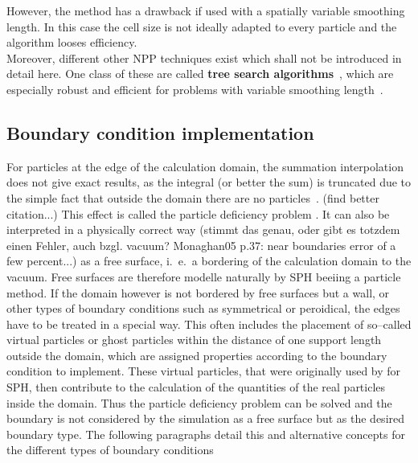 \documentclass{report}
\begin{document}
However, the method has a drawback if used with a spatially variable smoothing
length. In this case the cell size is not ideally adapted to every particle
and the algorithm looses efficiency.
\\
Moreover, different other NPP techniques exist which shall not be introduced in
detail here. One class of these are called {\bf tree search algorithms}~\cite{Hernquist1989}, which are
especially robust and efficient for problems with variable smoothing
length~\cite{Liu2003}.


\subsection{Boundary condition implementation}
\label{sec:boundaryConditionImplementation}
For particles at the edge of the calculation domain, the summation interpolation does not
give exact results, as the integral (or better the sum) is truncated due to
the simple fact that outside the domain there are no
particles~\cite{Liu2003}. (find better citation...) This effect is called the particle deficiency problem \cite{Liu2003}. %
It can also be interpreted in a physically correct way (stimmt das genau, oder gibt es totzdem einen Fehler, auch bzgl. vacuum? Monaghan05 p.37: near boundaries error of a few percent...) as a free surface, i.\ e.\ a bordering of the calculation domain to the vacuum. Free surfaces are therefore modelle naturally by SPH beeiing a particle method. If the domain however is not bordered by free surfaces but a wall, or other types of boundary conditions such as symmetrical or peroidical, the edges have to be treated in a special way. This often includes the placement of so--called virtual particles or ghost particles within the distance of one support length outside the domain, which are assigned properties according to the boundary condition to implement.
These virtual particles, that were originally used by \cite{Libersky1993} for SPH, then contribute to the calculation of the quantities of the real particles inside the domain. Thus the particle deficiency problem can be solved and the boundary is not considered by the simulation as a free surface but as the desired boundary type. 
 The following paragraphs detail this and alternative concepts for the different types of boundary conditions
\end{document}
